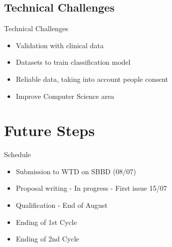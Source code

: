 \documentclass[aspectratio=169,10pt,xcolor={dvipsnames}]{beamer}
\begin{document}
\subsection{Technical Challenges}
\begin{frame}{Technical Challenges}
  \begin{itemize}
    \item Validation with clinical data
    \item Datasets to train classification model
    \item Reliable data, taking into account people consent
    \item Improve Computer Science area
  \end{itemize}
\end{frame}

  
  

  
\section{Future Steps}
\begin{frame}{Schedule}
  \begin{itemize}
    \item Submission to WTD on SBBD (08/07)
    \item Proposal writing - In progress - First issue 15/07
    \item Qualification - End of August
    \item Ending of 1st Cycle
    \item Ending of 2nd Cycle
  \end{itemize}
\end{frame}
\end{document}
